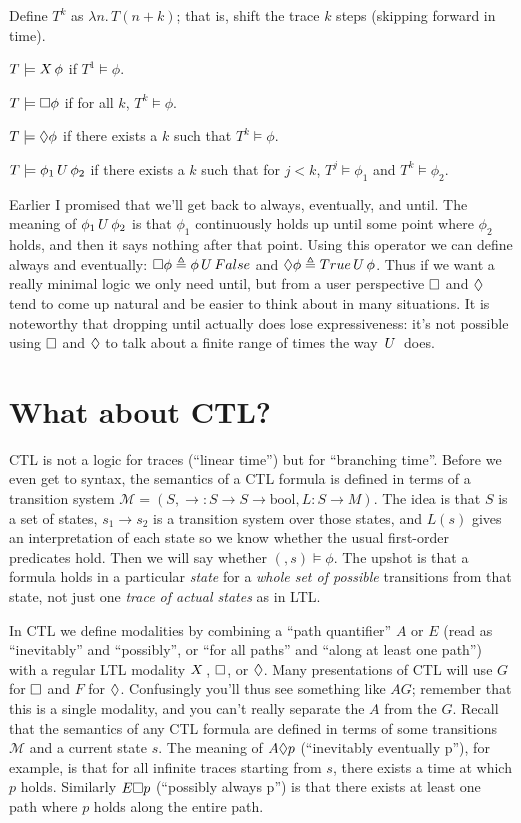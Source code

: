 \documentclass{scrbook}
\begin{document}
Define $T^{k}$ as $\lambda n.\, T(n + k)$; that is, shift the trace $k$ steps
(skipping forward in time).

$T \models X\, \phi$ if $T^{1} \models \phi$.

$T \models \square \phi$ if for all $k$, $T^{k} \models \phi$.

$T \models \lozenge \phi$ if there exists a $k$ such that $T^{k} \models \phi$.

$T \models \phi_1 \,U\, \phi_2$ if there exists a $k$ such that for
$j < k$, $T^{j} \models \phi_{1}$ and $T^{k} \models \phi_{2}$.

Earlier I promised that we'll get back to always, eventually, and until. The
meaning of $\phi_{1} \,U\, \phi_{2}$ is that $\phi_{1}$ continuously holds up
until some point where $\phi_{2}$ holds, and then it says nothing after that
point. Using this operator we can define always and eventually:
$\square \phi \triangleq \phi \,U\, False$ and
$\lozenge \phi \triangleq True \,U\, \phi$. Thus if we want a really minimal
logic we only need until, but from a user perspective $\square$ and
$\lozenge$ tend to come up natural and be easier to think about in many
situations. It is noteworthy that dropping until actually does lose
expressiveness: it's not possible using $\square$ and $\lozenge$ to talk
about a finite range of times the way $\,U\,$ does.

\section{What about CTL?}

CTL is not a logic for traces (``linear time'') but for ``branching time''.
Before we even get to syntax, the semantics of a CTL formula is defined in terms
of a transition system
$\mathcal{M} = (S, \to : S \to S \to \mathrm{bool}, L : S \to M)$. The idea is
that $S$ is a set of states, $s_1 \to s_2$ is a transition system over those
states, and $L(s)$ gives an interpretation of each state so we know whether the
usual first-order predicates hold. Then we will say whether
$(\mathcal, s) \models \phi$. The upshot is that a formula holds in a particular
\emph{state} for a \emph{whole set of possible} transitions from that state, not
just one \emph{trace of actual states} as in LTL.

In CTL we define modalities by combining a ``path quantifier'' $A$ or $E$ (read
as ``inevitably'' and ``possibly'', or ``for all paths'' and ``along at least
one path'') with a regular LTL modality $X\,$, $\square$, or $\lozenge$.
Many presentations of CTL will use $G$ for $\square$ and $F$ for $\lozenge$.
Confusingly you'll thus see something like $AG$; remember that this is a single
modality, and you can't really separate the $A$ from the $G$. Recall that the
semantics of any CTL formula are defined in terms of some transitions
$\mathcal{M}$ and a current state $s$. The meaning of $A\lozenge p$
(``inevitably eventually p''), for example, is that for all infinite traces
starting from $s$, there exists a time at which $p$ holds. Similarly
$E \square p$ (``possibly always p'') is that there exists at least one path
where $p$ holds along the entire path.
\end{document}
